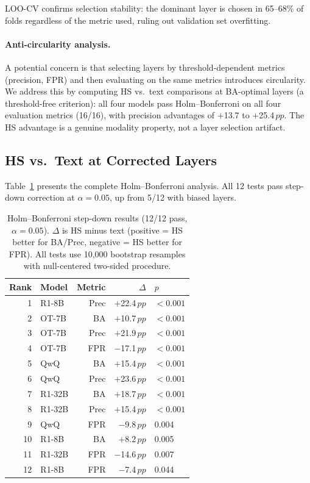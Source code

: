 \documentclass[11pt,a4paper]{article}
\newcommand{\pp}{\,pp}
\begin{document}
LOO-CV confirms selection stability: the dominant layer is chosen in 65--68\% of folds regardless of the metric used, ruling out validation set overfitting.

\paragraph{Anti-circularity analysis.}
A potential concern is that selecting layers by threshold-dependent metrics (precision, FPR) and then evaluating on the same metrics introduces circularity.
We address this by computing HS vs.\ text comparisons at BA-optimal layers (a threshold-free criterion): all four models pass Holm--Bonferroni on all four evaluation metrics (16/16), with precision advantages of $+$13.7 to $+$25.4$\pp$.
The HS advantage is a genuine modality property, not a layer selection artifact.


\subsection{HS vs.\ Text at Corrected Layers}
\label{sec:hs_vs_text}

Table~\ref{tab:hb_summary} presents the complete Holm--Bonferroni analysis.
All 12 tests pass step-down correction at $\alpha = 0.05$, up from 5/12 with biased layers.

\begin{table}[t]
\centering
\small
\begin{tabular}{rlrrl}
\toprule
\textbf{Rank} & \textbf{Model} & \textbf{Metric} & \textbf{$\Delta$} & \textbf{$p$} \\
\midrule
1 & R1-8B & Prec & $+$22.4$\pp$ & ${<}0.001$ \\
2 & OT-7B & BA & $+$10.7$\pp$ & ${<}0.001$ \\
3 & OT-7B & Prec & $+$21.9$\pp$ & ${<}0.001$ \\
4 & OT-7B & FPR & $-$17.1$\pp$ & ${<}0.001$ \\
5 & QwQ & BA & $+$15.4$\pp$ & ${<}0.001$ \\
6 & QwQ & Prec & $+$23.6$\pp$ & ${<}0.001$ \\
7 & R1-32B & BA & $+$18.7$\pp$ & ${<}0.001$ \\
8 & R1-32B & Prec & $+$15.4$\pp$ & ${<}0.001$ \\
9 & QwQ & FPR & $-$9.8$\pp$ & 0.004 \\
10 & R1-8B & BA & $+$8.2$\pp$ & 0.005 \\
11 & R1-32B & FPR & $-$14.6$\pp$ & 0.007 \\
12 & R1-8B & FPR & $-$7.4$\pp$ & 0.044 \\
\bottomrule
\end{tabular}
\caption{Holm--Bonferroni step-down results (12/12 pass, $\alpha=0.05$). $\Delta$ is HS minus text (positive = HS better for BA/Prec, negative = HS better for FPR). All tests use 10{,}000 bootstrap resamples with null-centered two-sided procedure.}
\label{tab:hb_summary}
\end{table}
\end{document}
